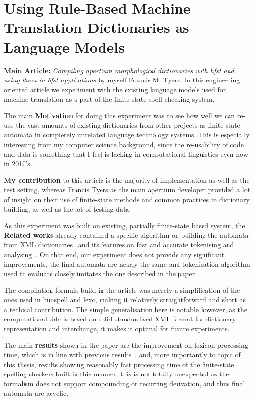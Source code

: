 \documentclass[officiallayout,draft]{unihelcompling}
\begin{document}
\section{Using Rule-Based Machine Translation Dictionaries as Language Models}
\label{sec:apertium}

\textbf{Main Article:} \emph{Compiling apertium morphological dictionaries with
hfst and using them in hfst applications} by myself Francis M. Tyers. In this
engineering oriented article we experiment with the existing language models
used for machine translation as a part of the finite-state spell-checking
system.

The main \textbf{Motivation} for doing this experiment was to see how well we
can re-use the vast amounts of existing dictionaries from other projects as
finite-state automata in completely unrelated language technology systems.
This is especially interesting from my computer science background, since
the re-usability of code and data is something that I feel is lacking in
computational linguistics even now in 2010's.

\textbf{My contribution} to this article is the majority of implementation
as well as the test setting, whereas Francis Tyers as the main apertium
developer provided a lot of insight on their use of finite-state methods
and common practices in dictionary building, as well as the lot of testing
data.

As this experiment was built on existing, partially finite-state based system,
the \textbf{Related works} already contained a specific algorithm on building
the automata from XML dictionaries~\cite{sergio2005construccion} and its
features on fast and accurate tokenising and analysing~\cite{}. On that end,
our experiment does not provide any significant improvements, the final
automata are nearly the same and tokenisation algorithm used to evaluate
closely imitates the one described in the paper.

The compilation formula build in the article was merely a simplification of
the ones used in hunspell and lexc, making it relatively straightforward and
short as a techical contribution. The simple generalisation here is notable
however, as the computational side is based on solid standardised XML
format for dictionary representation and interchange, it makes it optimal
for future experiments.

The main \textbf{results} shown in the paper are the improvement on lexicon
processing time, which is in line with previous 
results~\cite{silfverberg2009}, and, more importantly to topic of this thesis,
results showing reasonably fast processing time of the finite-state 
spelling checkers built in this manner; this is not totally unexpected as the
formalism does not support compounding or recurring derivation, and thus 
final automata are acyclic. 
\end{document}
